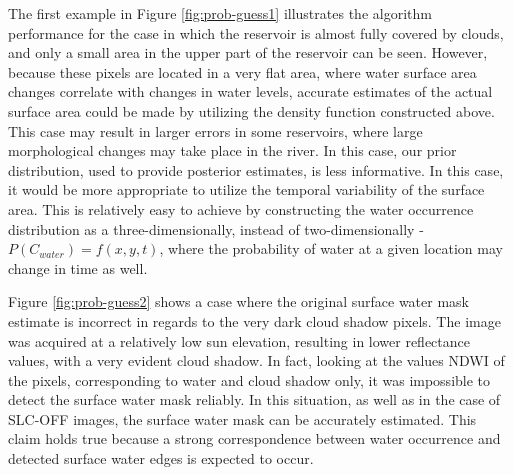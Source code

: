 The first example in Figure \ref{fig:prob-guess1} illustrates the algorithm performance for the case in which the reservoir is almost fully covered by clouds, and only a small area in the upper part of the reservoir can be seen. However, because these pixels are located in a very flat area, where water surface area changes correlate with changes in water levels, accurate estimates of the actual surface area could be made by utilizing the density function constructed above. This case may result in larger errors in some reservoirs, where large morphological changes may take place in the river. In this case, our prior distribution, used to provide posterior estimates, is less informative. In this case, it would be more appropriate to utilize the temporal variability of the surface area. This is relatively easy to achieve by constructing the water occurrence distribution as a three-dimensionally, instead of two-dimensionally - $P(C_{water}) = f(x,y,t)$, where the probability of water at a given location may change in time as well. 


Figure \ref{fig:prob-guess2} shows a case where the original surface water mask estimate is incorrect in regards to the very dark cloud shadow pixels. The image was acquired at a relatively low sun elevation, resulting in lower reflectance values, with a very evident cloud shadow. In fact, looking at the values NDWI of the pixels, corresponding to water and cloud shadow only, it was impossible to detect the surface water mask reliably. In this situation, as well as in the case of SLC-OFF images, the surface water mask can be accurately estimated. This claim holds true because a strong correspondence between water occurrence and detected surface water edges is expected to occur.

